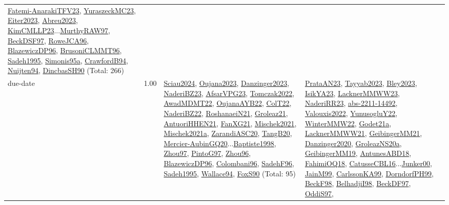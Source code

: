 {\begin{longtable}{p{3cm}r>{\raggedright\arraybackslash}p{6cm}>{\raggedright\arraybackslash}p{6cm}>{\raggedright\arraybackslash}p{8cm}}
\hyperref[detail:Fatemi-AnarakiTFV23]{Fatemi-AnarakiTFV23}, \hyperref[detail:YuraszeckMC23]{YuraszeckMC23}, \hyperref[detail:Eiter2023]{Eiter2023}, \hyperref[detail:Abreu2023]{Abreu2023}, \hyperref[detail:KimCMLLP23]{KimCMLLP23}...\hyperref[detail:MurthyRAW97]{MurthyRAW97}, \hyperref[detail:BeckDSF97]{BeckDSF97}, \hyperref[detail:RoweJCA96]{RoweJCA96}, \hyperref[detail:BlazewiczDP96]{BlazewiczDP96}, \hyperref[detail:BrusoniCLMMT96]{BrusoniCLMMT96}, \hyperref[detail:Sadeh1995]{Sadeh1995}, \hyperref[detail:Simonis95a]{Simonis95a}, \hyperref[detail:CrawfordB94]{CrawfordB94}, \hyperref[detail:Nuijten94]{Nuijten94}, \hyperref[detail:DincbasSH90]{DincbasSH90} (Total: 266)\\
\index{due-date}\index{Concepts!due-date}due-date &  1.00 & \hyperref[detail:Sciau2024]{Sciau2024}, \hyperref[detail:Oujana2023]{Oujana2023}, \hyperref[detail:Danzinger2023]{Danzinger2023}, \hyperref[detail:NaderiBZ23]{NaderiBZ23}, \hyperref[detail:AfsarVPG23]{AfsarVPG23}, \hyperref[detail:Tomczak2022]{Tomczak2022}, \hyperref[detail:AwadMDMT22]{AwadMDMT22}, \hyperref[detail:OujanaAYB22]{OujanaAYB22}, \hyperref[detail:ColT22]{ColT22}, \hyperref[detail:NaderiBZ22]{NaderiBZ22}, \hyperref[detail:RoshanaeiN21]{RoshanaeiN21}, \hyperref[detail:Groleaz21]{Groleaz21}, \hyperref[detail:AntuoriHHEN21]{AntuoriHHEN21}, \hyperref[detail:FanXG21]{FanXG21}, \hyperref[detail:Mischek2021]{Mischek2021}, \hyperref[detail:Mischek2021a]{Mischek2021a}, \hyperref[detail:ZarandiASC20]{ZarandiASC20}, \hyperref[detail:TangB20]{TangB20}, \hyperref[detail:Mercier-AubinGQ20]{Mercier-AubinGQ20}...\hyperref[detail:Baptiste1998]{Baptiste1998}, \hyperref[detail:Zhou97]{Zhou97}, \hyperref[detail:PintoG97]{PintoG97}, \hyperref[detail:Zhou96]{Zhou96}, \hyperref[detail:BlazewiczDP96]{BlazewiczDP96}, \hyperref[detail:Colombani96]{Colombani96}, \hyperref[detail:SadehF96]{SadehF96}, \hyperref[detail:Sadeh1995]{Sadeh1995}, \hyperref[detail:Wallace94]{Wallace94}, \hyperref[detail:FoxS90]{FoxS90} (Total: 95) & \hyperref[detail:PrataAN23]{PrataAN23}, \hyperref[detail:Tayyab2023]{Tayyab2023}, \hyperref[detail:Bley2023]{Bley2023}, \hyperref[detail:IsikYA23]{IsikYA23}, \hyperref[detail:LacknerMMWW23]{LacknerMMWW23}, \hyperref[detail:NaderiRR23]{NaderiRR23}, \hyperref[detail:abs-2211-14492]{abs-2211-14492}, \hyperref[detail:Valouxis2022]{Valouxis2022}, \hyperref[detail:YunusogluY22]{YunusogluY22}, \hyperref[detail:WinterMMW22]{WinterMMW22}, \hyperref[detail:Godet21a]{Godet21a}, \hyperref[detail:LacknerMMWW21]{LacknerMMWW21}, \hyperref[detail:GeibingerMM21]{GeibingerMM21}, \hyperref[detail:Danzinger2020]{Danzinger2020}, \hyperref[detail:GroleazNS20a]{GroleazNS20a}, \hyperref[detail:GeibingerMM19]{GeibingerMM19}, \hyperref[detail:AntunesABD18]{AntunesABD18}, \hyperref[detail:FahimiOQ18]{FahimiOQ18}, \hyperref[detail:CatusseCBL16]{CatusseCBL16}...\hyperref[detail:Junker00]{Junker00}, \hyperref[detail:JainM99]{JainM99}, \hyperref[detail:CarlssonKA99]{CarlssonKA99}, \hyperref[detail:DorndorfPH99]{DorndorfPH99}, \hyperref[detail:BeckF98]{BeckF98}, \hyperref[detail:BelhadjiI98]{BelhadjiI98}, \hyperref[detail:BeckDF97]{BeckDF97}, \hyperref[detail:OddiS97]{OddiS97}, 
\end{longtable}}

